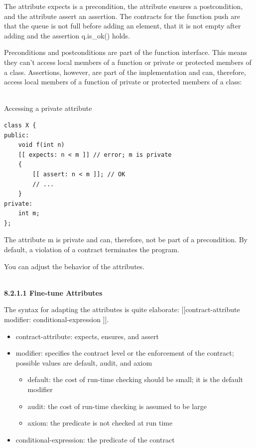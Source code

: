 The attribute expects is a precondition, the attribute ensures a postcondition, and the attribute assert an assertion. The contracts for the function push are that the queue is not full before adding an element, that it is not empty after adding and the assertion q.is\_ok() holds.

Preconditions and postconditions are part of the function interface. This means they can’t access local members of a function or private or protected members of a class. Assertions, however, are part of the implementation and can, therefore, access local members of a function of private or protected members of a class:

\hspace*{\fill} \\ %
\noindent
Accessing a private attribute
\begin{lstlisting}[style=styleCXX]
class X {
public:
	void f(int n)
	[[ expects: n < m ]] // error; m is private
	{
		[[ assert: n < m ]]; // OK
		// ...
	}
private:
	int m;
};
\end{lstlisting}

The attribute m is private and can, therefore, not be part of a precondition. By default, a violation of a contract terminates the program.

You can adjust the behavior of the attributes.

\hspace*{\fill} \\ %
\noindent
\textbf{8.2.1.1\hspace{0.2cm} Fine-tune Attributes}

The syntax for adapting the attributes is quite elaborate: [[contract-attribute modifier: conditional-expression ]].

\begin{itemize}
\item 
contract-attribute: expects, ensures, and assert

\item 
modifier: specifies the contract level or the enforcement of the contract; possible values are default, audit, and axiom
\begin{itemize}
\item 
default: the cost of run-time checking should be small; it is the default modifier

\item 
audit: the cost of run-time checking is assumed to be large

\item 
axiom: the predicate is not checked at run time
\end{itemize}

\item 
conditional-expression: the predicate of the contract
\end{itemize}

